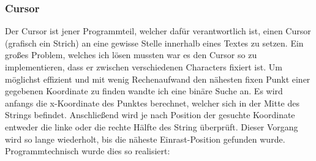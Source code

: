 \subsubsection{Cursor}

Der Cursor ist jener Programmteil, welcher dafür verantwortlich ist, einen Cursor (grafisch ein Strich) an eine gewisse Stelle innerhalb eines Textes zu setzen. Ein großes Problem, welches ich lösen mussten war es den Cursor so zu implementieren, dass er zwischen verschiedenen Characters fixiert ist. Um möglichst effizient und mit wenig Rechenaufwand den nähesten fixen Punkt einer gegebenen Koordinate zu finden wandte ich eine binäre Suche an. Es wird anfangs die x-Koordinate des Punktes berechnet, welcher sich in der Mitte des Strings befindet. Anschließend wird je nach Position der gesuchte Koordinate entweder die linke oder die rechte Hälfte des String überprüft. Dieser Vorgang wird so lange wiederholt, bis die näheste Einrast-Position gefunden wurde.\\
Programmtechnisch wurde dies so realisiert:
